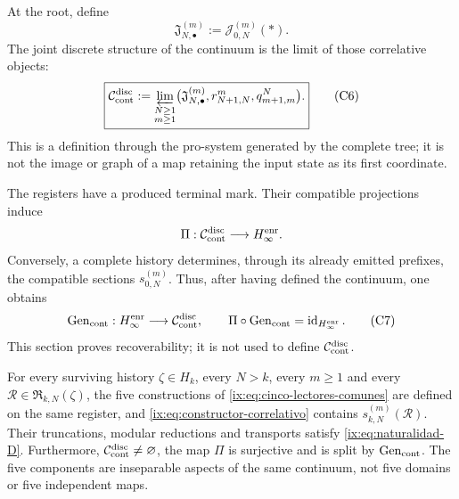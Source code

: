 At the root, define
\[
 \mathfrak J_{N,\bullet}^{(m)}:=\mathcal J_{0,N}^{(m)}(\ast).
\tag{C5}
\label{ix:eq:fibras-conjuntas-horizonte}
\]
The joint discrete structure of the continuum is the limit of those
correlative objects:
\[
 \boxed{
 \mathcal C_{\rm cont}^{\rm disc}
 :=\varprojlim_{\substack{N\geq1\\m\geq1}}
   \bigl(\mathfrak J_{N,\bullet}^{(m)},
         r^m_{N+1,N},q^N_{m+1,m}\bigr).}
\tag{C6}
\label{ix:eq:continuo-discreto}
\]
This is a definition through the pro-system generated by the complete tree; it is not
the image or graph of a map retaining the input state as
its first coordinate.

The registers have a produced terminal mark. Their compatible projections
induce
\[
 \Pi:\mathcal C_{\rm cont}^{\rm disc}\longrightarrow H_\infty^{\rm enr}.
\]
Conversely, a complete history determines, through its already emitted prefixes,
the compatible sections \(s_{0,N}^{(m)}\). Thus, after having
defined the continuum, one obtains
\[
 \operatorname{Gen}_{\rm cont}:H_\infty^{\rm enr}
 \longrightarrow\mathcal C_{\rm cont}^{\rm disc},
 \qquad
 \Pi\circ\operatorname{Gen}_{\rm cont}
 =\operatorname{id}_{H_\infty^{\rm enr}}.
\tag{C7}
\label{ix:eq:seccion-historias-continuo}
\]
This section proves recoverability; it is not used to define
\(\mathcal C_{\rm cont}^{\rm disc}\).

\begin{theorem}
\label{ix:thm:correlacion-cinco}
For every surviving history \(\zeta\in H_k\), every \(N>k\), every
\(m\geq1\) and every \(\mathscr R\in\mathfrak R_{k,N}(\zeta)\), the five
constructions of \eqref{ix:eq:cinco-lectores-comunes} are defined on the
same register, and \eqref{ix:eq:constructor-correlativo} contains
\(s_{k,N}^{(m)}(\mathscr R)\). Their truncations, modular reductions and
transports satisfy \eqref{ix:eq:naturalidad-D}. Furthermore,
\(\mathcal C_{\rm cont}^{\rm disc}\neq\varnothing\), the map \(\Pi\)
is surjective and is split by \(\operatorname{Gen}_{\rm cont}\). The
five components are inseparable aspects of the same continuum, not five
domains or five independent maps.
\end{theorem}

